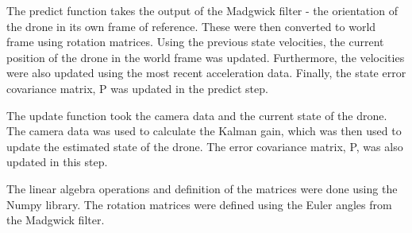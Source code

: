 \documentclass[bare_jrnl_transmag]{subfiles}
\begin{document}
The predict function takes the output of the Madgwick filter - the orientation of the drone in its own frame of reference. These were then converted to world frame using rotation matrices. Using the previous state velocities, the current position of the drone in the world frame was updated. Furthermore, the velocities were also updated using the most recent acceleration data. Finally, the state error covariance matrix, P was updated in the predict step. \newline

The update function took the camera data and the current state of the drone. The camera data was used to calculate the Kalman gain, which was then used to update the estimated state of the drone. The error covariance matrix, P, was also updated in this step.\newline

The linear algebra operations and definition of the matrices were done using the Numpy library. The rotation matrices were defined using the Euler angles from the Madgwick filter. 
\end{document}
